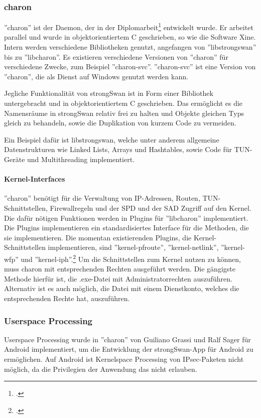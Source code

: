\subsubsection{charon}
''charon'' ist der Daemon, der in der Diplomarbeit\footcite[][]{jan_hutter_strongswan_2005} entwickelt wurde.
Er arbeitet parallel und wurde in objektorientiertem C geschrieben, so wie die Software Xine.
Intern werden verschiedene Bibliotheken genutzt, angefangen von ''libstrongswan'' bis zu ''libcharon''.
Es existieren verschiedene Versionen von ''charon'' für verschiedene Zwecke, zum Beispiel
''charon-svc''. ''charon-svc'' ist eine Version von ''charon'', die als Dienst auf Windows genutzt werden kann.

Jegliche Funktionalität von strongSwan ist in Form einer Bibliothek untergebracht und in objektorientiertem
C geschrieben. Das ermöglicht es die Namensräume in strongSwan relativ frei zu halten
und Objekte gleichen Typs gleich zu behandeln, sowie die Duplikation von kurzem Code
zu vermeiden.

Ein Beispiel dafür ist libstrongswan, welche unter anderem 
allgemeine Datenstrukturen wie Linked Lists, Arrays und Hashtables, sowie Code für TUN-Geräte und
Multithreading implementiert.

\paragraph{Kernel-Interfaces}
''charon'' benötigt für die Verwaltung von \ac{IP}-Adressen, Routen, TUN-Schnittstellen,
Firewallregeln und
der \ac{SPD} und der \ac{SAD} Zugriff auf den Kernel. Die dafür nötigen Funktionen
werden in Plugins für ''libcharon'' implementiert. Die Plugins implementieren ein
standardisiertes Interface für die Methoden, die sie implementieren.
Die momentan existierenden Plugins,
die Kernel-Schnittstellen implementieren, sind ''kernel-pfroute'', ''kernel-netlink'', ''kernel-wfp''
und ''kernel-iph''.\footcite[][]{_pluginlist_2016}
Um die Schnittstellen zum Kernel nutzen zu können, muss charon mit entsprechenden Rechten ausgeführt werden.
Die gängigste Methode hierfür ist, die .exe-Datei mit Administratorrechten auszuführen.
Alternativ ist es auch möglich, die Datei mit einem Dienstkonto, welches die entsprechenden Rechte hat,
auszuführen.

\subsubsection{Userspace Processing}
Userspace Processing wurde in ''charon'' von Guiliano Grassi und Ralf Sager für Android implementiert,
um die Entwicklung der strongSwan-App für Android zu ermöglichen. Auf Android ist Kernelspace Processing
von \ac{IPsec}-Paketen nicht möglich, da die Privilegien der Anwendung das nicht erlauben.

